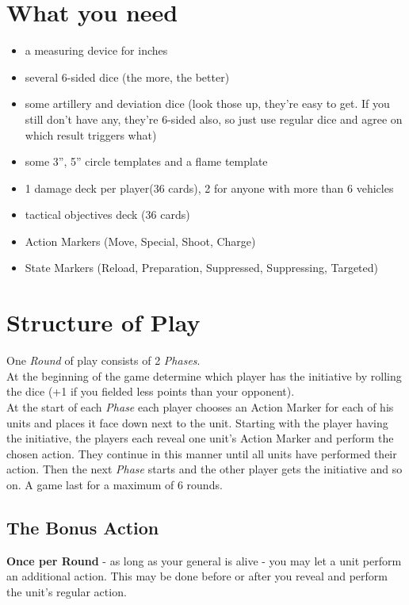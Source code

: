 \documentclass[
	11pt,
	toc=bibliography
	]{article}
\begin{document}
\section{What you need}\label{whatYouNeed}
\begin{itemize}
\item a measuring device for inches
\item several 6-sided dice (the more, the better)
\item some artillery and deviation dice (look those up, they're easy to get. If you still don't have any, they're 6-sided also, so just use regular dice and agree on which result triggers what)
\item some 3'', 5'' circle templates and a flame template
\item 1 damage deck per player(36 cards), 2 for anyone with more than 6 vehicles
\item tactical objectives deck (36 cards)
\item Action Markers (Move, Special, Shoot, Charge)
\item State Markers (Reload, Preparation, Suppressed, Suppressing, Targeted)
\end{itemize}

\section{Structure of Play}\label{structureOfPlay}
One \textit{Round} of play consists of 2 \textit{Phases}.\\
At the beginning of the game determine which player has the initiative by rolling the dice (+1 if you fielded less points than your opponent).\\
At the start of each \textit{Phase} each player chooses an Action Marker for each of his units and places it face down next to the unit. Starting with the player having the initiative, the players each reveal one unit's Action Marker and perform the chosen action. They continue in this manner until all units have performed their action. Then the next \textit{Phase} starts and the other player gets the initiative and so on.
A game last for a maximum of 6 rounds.

\subsection{The Bonus Action}\label{theBonusAction}
\textbf{Once per Round} - as long as your general is alive - you may let a unit perform an additional action. This may be done before or after you reveal and perform the unit's regular action.
\end{document}
